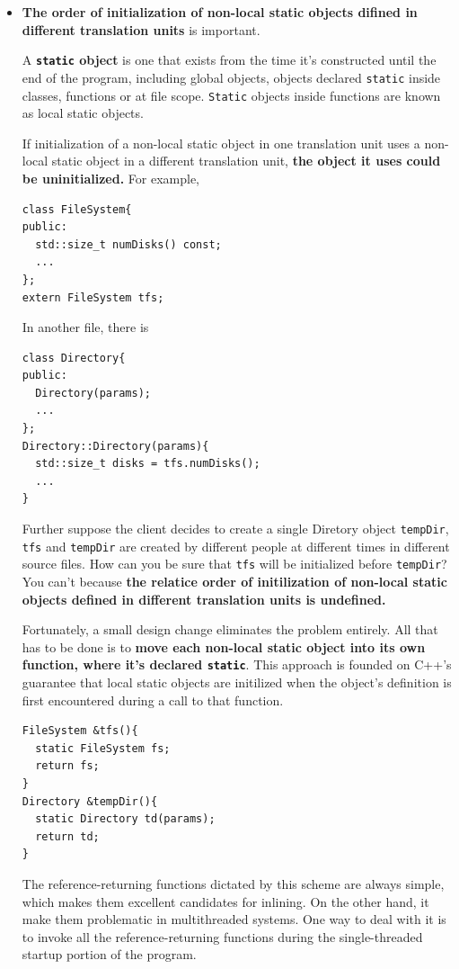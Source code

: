 \begin{itemize}
\item \textbf{The order of initialization of non-local static objects difined
    in different translation units} is important.

  A \textbf{\texttt{static} object} is one that exists from the time it's
  constructed until the end of the program, including global objects,
  objects declared \texttt{static} inside classes, functions or at
  file scope. \texttt{Static} objects inside functions are known as
  local static objects.

  If initialization of a non-local static object in one translation
  unit uses a non-local static object in a different translation unit,
  \textbf{the object it uses could be uninitialized.} For example, 
\begin{verbatim}
class FileSystem{
public:
  std::size_t numDisks() const;
  ...
};
extern FileSystem tfs;
\end{verbatim}
  In another file, there is
\begin{verbatim}
class Directory{
public:
  Directory(params);
  ...
};
Directory::Directory(params){ 
  std::size_t disks = tfs.numDisks(); 
  ...
}
\end{verbatim}
Further suppose the client decides to create a single Diretory object \texttt{tempDir},
\texttt{tfs} and \texttt{tempDir} are created by different people at
different times in different source files. How can you be sure that
\texttt{tfs} will be initialized before \texttt{tempDir}? You can't
because \textbf{the relatice order of initilization of non-local
  static objects defined in different translation units is undefined.}

Fortunately, a small design change eliminates the problem
entirely. All that has to be done is to \textbf{move each non-local
  static object into its own function, where it's declared
  \texttt{static}}. This approach is founded on C++'s guarantee that local
static objects are initilized when the object's definition is first
encountered during a call to that function.
\begin{verbatim}
FileSystem &tfs(){
  static FileSystem fs;
  return fs;
}
Directory &tempDir(){
  static Directory td(params);
  return td;
}
\end{verbatim}
The reference-returning functions dictated by this scheme are always
simple, which makes them excellent candidates for inlining. On the
other hand, it make them problematic in multithreaded systems. One way
to deal with it is to invoke all the reference-returning functions
during the single-threaded startup portion of the program.
\end{itemize}

